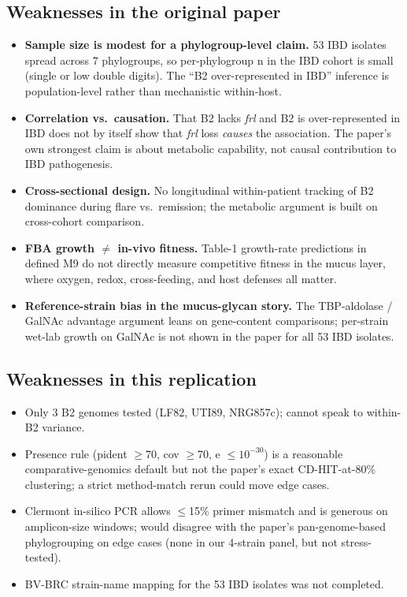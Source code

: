 \documentclass[11pt]{article}
\begin{document}
\subsection*{Weaknesses in the original paper}
\begin{itemize}
  \item \textbf{Sample size is modest for a phylogroup-level claim.} 53
    IBD isolates spread across 7 phylogroups, so per-phylogroup n in
    the IBD cohort is small (single or low double digits). The
    ``B2 over-represented in IBD'' inference is population-level rather
    than mechanistic within-host.
  \item \textbf{Correlation vs.\ causation.} That B2 lacks \emph{frl}
    and B2 is over-represented in IBD does not by itself show that
    \emph{frl} loss \emph{causes} the association. The paper's own
    strongest claim is about metabolic capability, not causal
    contribution to IBD pathogenesis.
  \item \textbf{Cross-sectional design.} No longitudinal within-patient
    tracking of B2 dominance during flare vs.\ remission; the metabolic
    argument is built on cross-cohort comparison.
  \item \textbf{FBA growth $\neq$ in-vivo fitness.} Table-1 growth-rate
    predictions in defined M9 do not directly measure competitive
    fitness in the mucus layer, where oxygen, redox, cross-feeding, and
    host defenses all matter.
  \item \textbf{Reference-strain bias in the mucus-glycan story.} The
    TBP-aldolase / GalNAc advantage argument leans on gene-content
    comparisons; per-strain wet-lab growth on GalNAc is not shown in
    the paper for all 53 IBD isolates.
\end{itemize}

\subsection*{Weaknesses in this replication}
\begin{itemize}
  \item Only 3 B2 genomes tested (LF82, UTI89, NRG857c); cannot speak
    to within-B2 variance.
  \item Presence rule (pident $\geq$70, cov $\geq$70, e $\leq10^{-30}$)
    is a reasonable comparative-genomics default but not the paper's
    exact CD-HIT-at-80\% clustering; a strict method-match rerun could
    move edge cases.
  \item Clermont in-silico PCR allows $\leq$15\% primer mismatch and is
    generous on amplicon-size windows; would disagree with the paper's
    pan-genome-based phylogrouping on edge cases (none in our 4-strain
    panel, but not stress-tested).
  \item BV-BRC strain-name mapping for the 53 IBD isolates was not
    completed.
\end{itemize}
\end{document}
